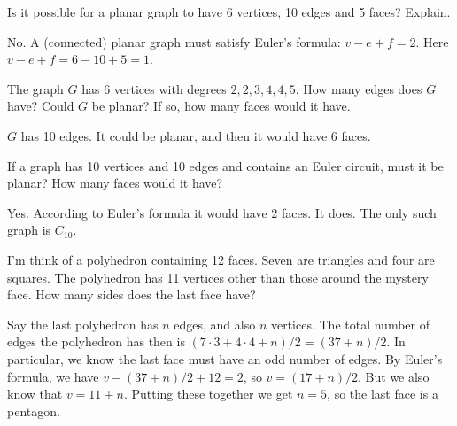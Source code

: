 \begin{questions}

	
\question Is it possible for a planar graph to have 6 vertices, 10 edges and 5 faces?  Explain.

	\begin{answer}
		No.  A (connected) planar graph must satisfy Euler's formula: $v - e + f = 2$.  Here $v - e + f = 6 - 10 + 5 = 1$. %
	\end{answer}
	
	



\question The graph $G$ has 6 vertices with degrees $2, 2, 3, 4, 4, 5$.  How many edges does $G$ have?  Could $G$ be planar?  If so, how many faces would it have.

	\begin{answer}
		$G$ has 10 edges.  It could be planar, and then it would have 6 faces. %
	\end{answer}
	




\question If a graph has 10 vertices and 10 edges and contains an Euler circuit, must it be planar?  How many faces would it have?

	\begin{answer}
		Yes.  According to Euler's formula it would have 2 faces.  It does.  The only such graph is $C_{10}$. %
	\end{answer}



\question I'm think of a polyhedron containing 12 faces.  Seven are triangles and four are squares.  The polyhedron has 11 vertices other than those around the mystery face.  How many sides does the last face have?

	\begin{answer}
	Say the last polyhedron has $n$ edges, and also $n$ vertices.  The total number of edges the polyhedron has then is $(7 \cdot 3 + 4 \cdot 4 + n)/2 = (37 + n)/2$.  In particular, we know the last face must have an odd number of edges.  By Euler's formula, we have $v - (37+n)/2 + 12 = 2$, so $v = (17 + n)/2$.  But we also know that $v = 11 + n$.  Putting these together we get $n = 5$, so the last face is a pentagon.
	\end{answer}
	



\end{questions}
